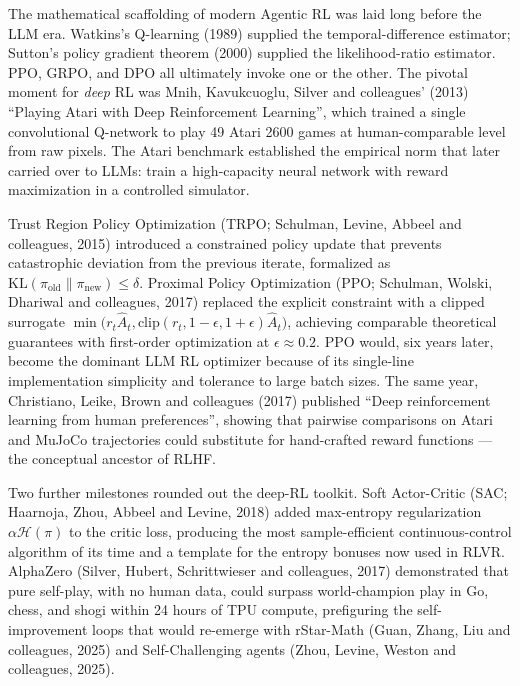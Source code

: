 The mathematical scaffolding of modern Agentic RL was laid long before the LLM era. Watkins's Q-learning (1989) supplied the temporal-difference estimator; Sutton's policy gradient theorem (2000) supplied the likelihood-ratio estimator. PPO, GRPO, and DPO all ultimately invoke one or the other. The pivotal moment for \emph{deep} RL was Mnih, Kavukcuoglu, Silver and colleagues' (2013) ``Playing Atari with Deep Reinforcement Learning'', which trained a single convolutional Q-network to play 49 Atari 2600 games at human-comparable level from raw pixels. The Atari benchmark established the empirical norm that later carried over to LLMs: train a high-capacity neural network with reward maximization in a controlled simulator.

Trust Region Policy Optimization (TRPO; Schulman, Levine, Abbeel and colleagues, 2015) introduced a constrained policy update that prevents catastrophic deviation from the previous iterate, formalized as \(\mathrm{KL}(\pi_{\mathrm{old}} \| \pi_{\mathrm{new}}) \le \delta\). Proximal Policy Optimization (PPO; Schulman, Wolski, Dhariwal and colleagues, 2017) replaced the explicit constraint with a clipped surrogate \(\min\bigl(r_t \hat A_t, \mathrm{clip}(r_t, 1-\epsilon, 1+\epsilon) \hat A_t\bigr)\), achieving comparable theoretical guarantees with first-order optimization at \(\epsilon \approx 0.2\). PPO would, six years later, become the dominant LLM RL optimizer because of its single-line implementation simplicity and tolerance to large batch sizes. The same year, Christiano, Leike, Brown and colleagues (2017) published ``Deep reinforcement learning from human preferences'', showing that pairwise comparisons on Atari and MuJoCo trajectories could substitute for hand-crafted reward functions --- the conceptual ancestor of RLHF.

Two further milestones rounded out the deep-RL toolkit. Soft Actor-Critic (SAC; Haarnoja, Zhou, Abbeel and Levine, 2018) added max-entropy regularization \(\alpha \mathcal{H}(\pi)\) to the critic loss, producing the most sample-efficient continuous-control algorithm of its time and a template for the entropy bonuses now used in RLVR. AlphaZero (Silver, Hubert, Schrittwieser and colleagues, 2017) demonstrated that pure self-play, with no human data, could surpass world-champion play in Go, chess, and shogi within 24 hours of TPU compute, prefiguring the self-improvement loops that would re-emerge with rStar-Math (Guan, Zhang, Liu and colleagues, 2025) and Self-Challenging agents (Zhou, Levine, Weston and colleagues, 2025).

